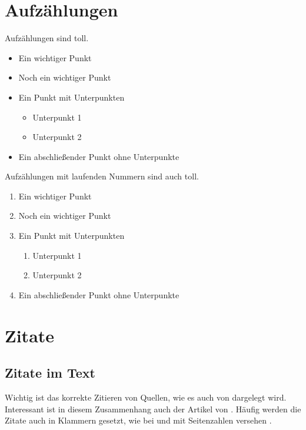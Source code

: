 \section{Aufzählungen}

Aufzählungen sind toll.

\begin{itemize}
  \item Ein wichtiger Punkt
  \item Noch ein wichtiger Punkt
  \item Ein Punkt mit Unterpunkten
    \begin{itemize}
      \item Unterpunkt 1
      \item Unterpunkt 2
    \end{itemize}
  \item Ein abschließender Punkt ohne Unterpunkte
\end{itemize}


Aufzählungen mit laufenden Nummern sind auch toll.

\begin{enumerate}
  \item Ein wichtiger Punkt
  \item Noch ein wichtiger Punkt
  \item Ein Punkt mit Unterpunkten
    \begin{enumerate}
      \item Unterpunkt 1
      \item Unterpunkt 2
    \end{enumerate}
  \item Ein abschließender Punkt ohne Unterpunkte
\end{enumerate}


\section{Zitate}

\subsection{Zitate im Text}

Wichtig ist das korrekte Zitieren von Quellen, wie es auch von \cite{Kornmeier2011} dargelegt wird. Interessant ist in diesem Zusammenhang auch der Artikel von \cite{Kramer2009}. Häufig werden die Zitate auch in Klammern gesetzt, wie bei \parencite{Kornmeier2011} und mit Seitenzahlen versehen \parencite[S. 22--24]{Kornmeier2011}.

